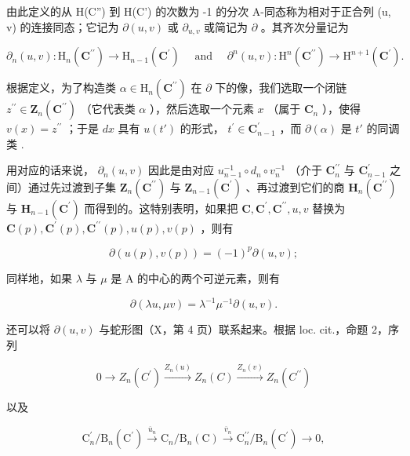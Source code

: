 由此定义的从 H(C'') 到 H(C') 的次数为 -1 的分次 A-同态称为相对于正合列 (u, v) 的连接同态；它记为 \(\partial(u, v)\) 或 \(\partial_{u,v}\) 或简记为 \(\partial\) 。其齐次分量记为

\[
\partial_ {n} (u, v): \mathrm{H} _ {n} (\mathbf {C} ^ {\prime \prime}) \rightarrow \mathrm{H} _ {n - 1} (\mathbf {C} ^ {\prime}) \quad \text { and } \quad \partial^ {n} (u, v): \mathrm{H} ^ {n} (\mathbf {C} ^ {\prime \prime}) \rightarrow \mathrm{H} ^ {n + 1} (\mathbf {C} ^ {\prime}).
\]

根据定义，为了构造类 \(\alpha\in\mathrm{H}_{n}(\mathbf{C}^{\prime\prime})\) 在 \(\partial\) 下的像，我们选取一个闭链 \(z^{\prime\prime}\in\mathbf{Z}_{n}(\mathbf{C}^{\prime\prime})\) （它代表类 \(\alpha\) ），然后选取一个元素 \(x\) （属于 \(\mathbf{C}_{n}\) ），使得 \(v(x)=z^{\prime\prime}\) ；于是 \(dx\) 具有 \(u(t')\) 的形式， \(t^{\prime}\in\mathbf{C}_{n-1}^{\prime}\) ，而 \(\partial(\alpha)\) 是 \(t'\) 的同调类 .

用对应的话来说， \(\partial_{n}(u,v)\) 因此是由对应 \(u_{n-1}^{-1}\circ d_{n}\circ v_{n}^{-1}\) （介于 \(\mathbf{C}_{n}^{\prime\prime}\) 与 \(\mathbf{C}_{n-1}^{\prime}\) 之间）通过先过渡到子集 \(\mathbf{Z}_{n}(\mathbf{C}^{\prime\prime})\) 与 \(\mathbf{Z}_{n-1}(\mathbf{C}^{\prime})\) 、再过渡到它们的商 \(\mathbf{H}_{n}(\mathbf{C}^{\prime\prime})\) 与 \(\mathbf{H}_{n-1}(\mathbf{C}^{\prime})\) 而得到的。这特别表明，如果把 \(\mathbf{C},\mathbf{C}^{\prime},\mathbf{C}^{\prime\prime},u,v\) 替换为 \(\mathbf{C}(p),\mathbf{C}^{\prime}(p),\mathbf{C}^{\prime\prime}(p),u(p),v(p)\) ，则有

\[
\partial (u (p), v (p)) = (- 1) ^ {p} \partial (u, v);\tag{4}
\]

同样地，如果 \(\lambda\) 与 \(\mu\) 是 A 的中心的两个可逆元素，则有

\[
\partial (\lambda u, \mu v) = \lambda^ {- 1} \mu^ {- 1} \partial (u, v).\tag{5}
\]

还可以将 \(\partial(u,v)\) 与蛇形图（X，第 4 页）联系起来。根据 loc. cit.，命题 2，序列

\[
0 \longrightarrow Z _ {n} (C ^ {\prime}) \xrightarrow {Z _ {n} (u)} Z _ {n} (C) \xrightarrow {Z _ {n} (v)} Z _ {n} (C ^ {\prime \prime})
\]

以及

\[
\mathrm{C} _ {n} ^ {\prime} / \mathrm{B} _ {n} (\mathrm{C} ^ {\prime}) \xrightarrow {\overline {{{u}}} _ {n}} \mathrm{C} _ {n} / \mathrm{B} _ {n} (\mathrm{C}) \xrightarrow {\overline {{{v}}} _ {n}} \mathrm{C} _ {n} ^ {\prime \prime} / \mathrm{B} _ {n} (\mathrm{C} ^ {\prime}) \longrightarrow 0,
\]

